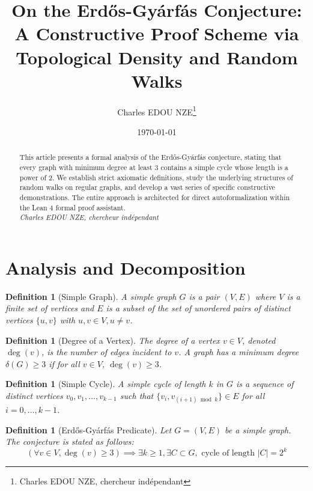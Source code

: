 \documentclass[12pt,a4paper]{article}
\title{On the Erd\H{o}s-Gy\'arf\'as Conjecture: A Constructive Proof Scheme via Topological Density and Random Walks}
\author{Charles EDOU NZE\thanks{Charles EDOU NZE, chercheur ind\'ependant}}
\date{\today}
\newtheorem{definition}[theorem]{Definition}
\begin{document}
\maketitle

\begin{abstract}
This article presents a formal analysis of the Erd\H{o}s-Gy\'arf\'as conjecture, stating that every graph with minimum degree at least 3 contains a simple cycle whose length is a power of 2. We establish strict axiomatic definitions, study the underlying structures of random walks on regular graphs, and develop a vast series of specific constructive demonstrations. The entire approach is architected for direct autoformalization within the Lean 4 formal proof assistant.
\vspace{0.5cm}\\
\noindent \textit{Charles EDOU NZE, chercheur ind\'ependant}
\end{abstract}

\tableofcontents
\newpage

\section{Analysis and Decomposition}

\begin{definition}[Simple Graph]
A simple graph $G$ is a pair $(V, E)$ where $V$ is a finite set of vertices and $E$ is a subset of the set of unordered pairs of distinct vertices $\{u, v\}$ with $u, v \in V, u \neq v$.
\end{definition}

\begin{definition}[Degree of a Vertex]
The degree of a vertex $v \in V$, denoted $\deg(v)$, is the number of edges incident to $v$. A graph has a minimum degree $\delta(G) \geq 3$ if for all $v \in V$, $\deg(v) \geq 3$.
\end{definition}

\begin{definition}[Simple Cycle]
A simple cycle of length $k$ in $G$ is a sequence of distinct vertices $v_0, v_1, \dots, v_{k-1}$ such that $\{v_i, v_{(i+1) \bmod k}\} \in E$ for all $i = 0, \dots, k-1$.
\end{definition}

\begin{definition}[Erd\H{o}s-Gy\'arf\'as Predicate]
Let $G = (V, E)$ be a simple graph. The conjecture is stated as follows:
$$ (\forall v \in V, \deg(v) \geq 3) \implies \exists k \geq 1, \exists C \subset G, \text{ cycle of length } |C| = 2^k $$
\end{definition}
\end{document}
